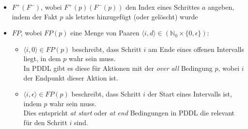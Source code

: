 \begin{itemize}
    \item $F^+(F^-)$, wobei $F^+(p)(F^-(p))$ den Index eines Schrittes $a$ angeben, indem der Fakt $p$ als letztes hinzugefügt (oder gelöscht) wurde
    \item $FP$, wobei $FP(p)$ eine Menge von Paaren $\langle i,d \rangle \in (\mathbb{N}_0 \times \{0,\epsilon\})$:\\
    \begin{itemize}
        \item $\langle i,0 \rangle \in FP(p)$ beschreibt, dass Schritt $i$ am Ende eines offenen Intervalls liegt, in dem $p$ wahr sein muss.\\
        In \ac{PDDL} gibt es diese für Aktionen mit der \emph{over all} Bedingung $p$, wobei $i$ der Endpunkt dieser Aktion ist.
        \item $\langle i,\epsilon \rangle \in FP(p)$ beschreibt, dass Schritt $i$ der Start eines Intervalls ist, indem $p$ wahr sein muss.\\
        Dies entspricht \emph{at start} oder \emph{at end} Bedingungen in \ac{PDDL} die relevant für den Schritt $i$ sind.
    \end{itemize}
\end{itemize}

